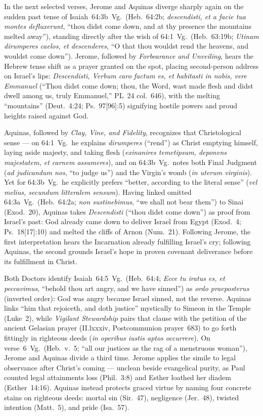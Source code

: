 In the next selected verses, Jerome and Aquinas diverge sharply again on the sudden past tense of Isaiah~64:3b~Vg.\ (Heb.~64:2b; \emph{descendisti, et a facie tua montes defluxerunt}, ``thou didst come down, and at thy presence the mountains melted away''), standing directly after the wish of 64:1~Vg.\ (Heb.~63:19b; \emph{Utinam dirumperes caelos, et descenderes}, ``O that thou wouldst rend the heavens, and wouldst come down''). Jerome, followed by \emph{Forbearance and Unveiling}, hears the Hebrew tense shift as a prayer granted on the spot, placing second-person address on Israel's lips: \emph{Descendisti, Verbum caro factum es, et habitasti in nobis, vere Emmanuel} (``Thou didst come down; thou, the Word, wast made flesh and didst dwell among us, truly Emmanuel,'' PL~24 col.~646), with the melting ``mountains'' (Deut.~4:24; Ps.~97[96]:5) signifying hostile powers and proud heights raised against God.

Aquinas, followed by \emph{Clay, Vine, and Fidelity}, recognizes that Christological sense --- on 64:1~Vg.\ he explains \emph{dirumperes} (``rend'') as Christ emptying himself, laying aside majesty, and taking flesh (\emph{exinanires temetipsum, deponens majestatem, et carnem assumeres}), and on 64:3b~Vg.\ notes both Final Judgment (\emph{ad judicandum nos}, ``to judge us'') and the Virgin's womb (\emph{in uterum virginis}). Yet for 64:3b~Vg.\ he explicitly prefers ``better, according to the literal sense'' (\emph{vel melius, secundum litteralem sensum}). Having linked omitted 64:3a~Vg.\ (Heb.~64:2a; \emph{non sustinebimus}, ``we shall not bear them'') to Sinai (Exod.~20), Aquinas takes \emph{Descendisti} (``thou didst come down'') as proof from Israel's past: God already came down to deliver Israel from Egypt (Exod.~4; Ps.~18[17]:10) and melted the cliffs of Arnon (Num.~21). Following Jerome, the first interpretation hears the Incarnation already fulfilling Israel's cry; following Aquinas, the second grounds Israel's hope in proven covenant deliverance before its fulfillment in Christ.

Both Doctors identify Isaiah~64:5~Vg.\ (Heb.~64:4; \emph{Ecce tu iratus es, et peccavimus}, ``behold thou art angry, and we have sinned'') as \emph{ordo praeposterus} (inverted order): God was angry because Israel sinned, not the reverse. Aquinas links ``him that rejoiceth, and doth justice'' mystically to Simeon in the Temple (Luke~2), while \emph{Vigilant Stewardship} pairs that clause with the petition of the ancient Gelasian prayer (II.lxxxiv, Postcommunion prayer~683) to go forth fittingly in righteous deeds (\emph{in operibus iustis aptos occurrere}). On verse~6~Vg.\ (Heb.~v.~5; ``all our justices as the rag of a menstruous woman''), Jerome and Aquinas divide a third time. Jerome applies the simile to legal observance after Christ's coming --- unclean beside evangelical purity, as Paul counted legal attainments loss (Phil.~3:8) and Esther loathed her diadem (Esther~14:16). Aquinas instead protects graced virtue by naming four concrete stains on righteous deeds: mortal sin (Sir.~47), negligence (Jer.~48), twisted intention (Matt.~5), and pride (Isa.~57).

